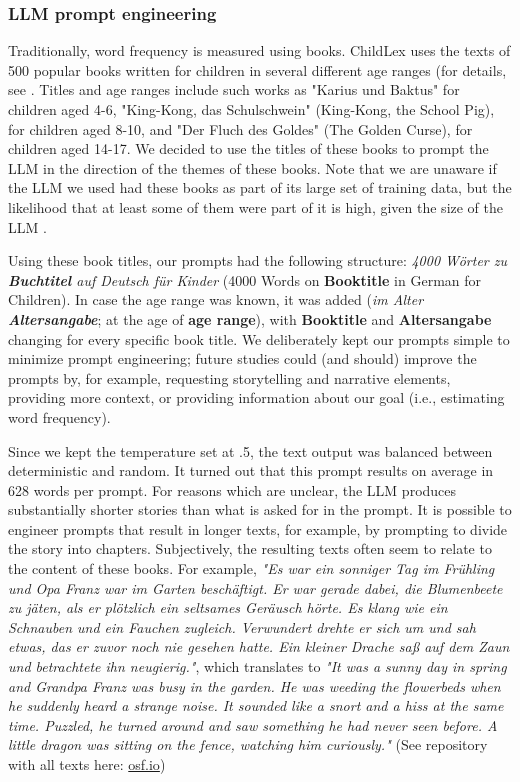 \documentclass[manuscript]{stjour}
\begin{document}
\subsubsection*{LLM prompt engineering}

Traditionally, word frequency is measured using books. ChildLex uses the texts of 500 popular books written for children in several different age ranges (for details, see \citep{schroeder_childlex_2015}. Titles and age ranges include such works as "Karius und Baktus" for children aged 4-6, "King-Kong, das Schulschwein" (King-Kong, the School Pig), for children aged 8-10, and "Der Fluch des Goldes" (The Golden Curse), for children aged 14-17. We decided to use the titles of these books to prompt the LLM in the direction of the themes of these books. Note that we are unaware if the LLM we used had these books as part of its large set of training data, but the likelihood that at least some of them were part of it is high, given the size of the LLM \citep{liu_datasets_2024}.  
 
Using these book titles, our prompts had the following structure: \textit{4000 Wörter zu \textbf{Buchtitel} auf Deutsch für Kinder} (4000 Words on \textbf{Booktitle} in German for Children). In case the age range was known, it was added (\textit{im Alter \textbf{Altersangabe}}; at the age of \textbf{age range}), with \textbf{Booktitle} and \textbf{Altersangabe} changing for every specific book title. We deliberately kept our prompts simple to minimize prompt engineering; future studies could (and should) improve the prompts by, for example, requesting storytelling and narrative elements, providing more context, or providing information about our goal (i.e., estimating word frequency). 

Since we kept the temperature set at .5, the text output was balanced between deterministic and random. It turned out that this prompt results on average in 628 words per prompt. For reasons which are unclear, the LLM produces substantially shorter stories than what is asked for in the prompt. It is possible to engineer prompts that result in longer texts, for example, by prompting to divide the story into chapters. Subjectively, the resulting texts often seem to relate to the content of these books. For example, \textit{"Es war ein sonniger Tag im Frühling und Opa Franz war im Garten beschäftigt. Er war gerade dabei, die Blumenbeete zu jäten, als er plötzlich ein seltsames Geräusch hörte. Es klang wie ein Schnauben und ein Fauchen zugleich. Verwundert drehte er sich um und sah etwas, das er zuvor noch nie gesehen hatte. Ein kleiner Drache saß auf dem Zaun und betrachtete ihn neugierig."}, which translates to \textit{"It was a sunny day in spring and Grandpa Franz was busy in the garden. He was weeding the flowerbeds when he suddenly heard a strange noise. It sounded like a snort and a hiss at the same time. Puzzled, he turned around and saw something he had never seen before. A little dragon was sitting on the fence, watching him curiously."} (See repository with all texts here: \href{dx.doi.org/10.17605/OSF.IO/WMUVJ}{osf.io})
\end{document}
